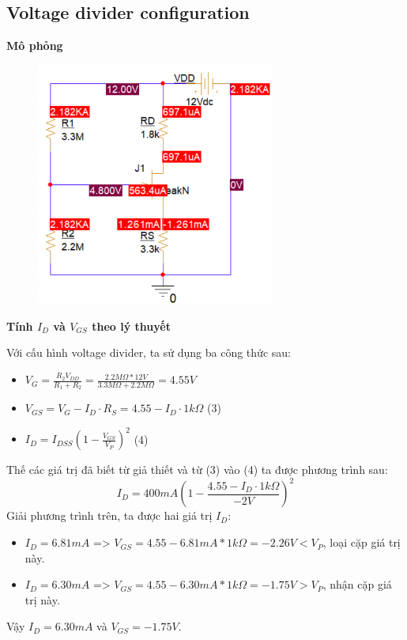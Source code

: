 \subsection{Voltage divider configuration}
\textbf{Mô phỏng}
\begin{figure}[!htbp]
    \centering
    \includegraphics[width=0.7\textwidth]{graphics/ex1/f2.PNG}
\end{figure}

\textbf{Tính $I_D$ và $V_{GS}$ theo lý thuyết}

Với cấu hình voltage divider, ta sử dụng ba công thức sau:
\begin{itemize}
    \item $V_G = \frac{R_2 V_{DD}}{R_1 + R_2} = \frac{2.2M \Omega * 12V}{3.3M \Omega + 2.2M \Omega} = 4.55V$
    \item $V_{GS} = V_G - I_D \cdot R_S = 4.55 - I_D \cdot 1k \Omega$ (3)
    \item $I_D = I_{DSS} \left(1 - \frac{V_{GS}}{V_P}\right)^2$ (4) 
\end{itemize}
Thế các giá trị đã biết từ giả thiết và từ (3) vào (4) ta được phương trình sau:
\[
    I_D = 400mA \left(1 - \frac{4.55 - I_D \cdot 1k \Omega}{-2V}\right)^2
\]
Giải phương trình trên, ta được hai giá trị $I_D$:
\begin{itemize}
    \item $I_D = 6.81mA$ => $V_{GS} = 4.55 - 6.81mA * 1k \Omega = -2.26V < V_{P}$, loại cặp giá trị này.
    \item $I_D = 6.30mA$ => $V_{GS} = 4.55 - 6.30mA * 1k \Omega = -1.75V > V_{P}$, nhận cặp giá trị này.
\end{itemize}
Vậy $I_D = 6.30mA$ và $V_{GS} = -1.75V$.